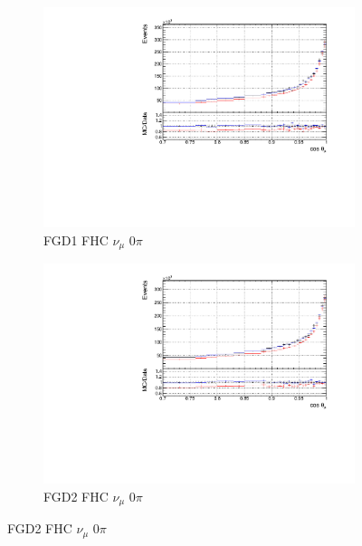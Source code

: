 \begin{figure}[!h]
\begin{subfigure}{0.49\textwidth}
  \centering
  \includegraphics[width=\textwidth]{figs/priorpred1D_t_FGD1_numuCC_0pi}
  \caption{FGD1 FHC $\nu_{\mu}$ 0$\pi$}
\end{subfigure}
\begin{subfigure}{0.49\textwidth}
  \centering
  \includegraphics[width=\textwidth]{figs/priorpred1D_t_FGD2_numuCC_0pi}
  \caption{FGD2 FHC $\nu_{\mu}$ 0$\pi$}
\end{subfigure}


\end{figure}
